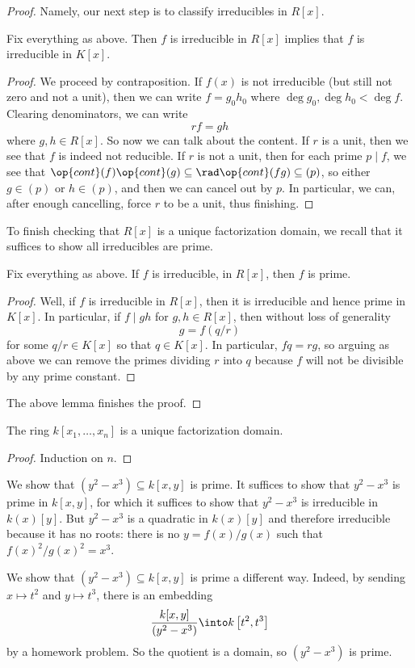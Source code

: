 \begin{proof}
	Namely, our next step is to classify irreducibles in $R[x]$.
	\begin{lemma}
		Fix everything as above. Then $f$ is irreducible in $R[x]$ implies that $f$ is irreducible in $K[x]$.
	\end{lemma}
	\begin{proof}
		We proceed by contraposition. If $f(x)$ is not irreducible (but still not zero and not a unit), then we can write $f=g_0h_0$ where $\deg g_0,\deg h_0<\deg f$. Clearing denominators, we can write
		\[rf=gh\]
		where $g,h\in R[x]$. So now we can talk about the content. If $r$ is a unit, then we see that $f$ is indeed not reducible. If $r$ is not a unit, then for each prime $p\mid f$, we see that $\op{cont}(f)\op{cont}(g)\subseteq\rad\op{cont}(fg)\subseteq(p)$, so either $g\in(p)$ or $h\in(p)$, and then we can cancel out by $p$. In particular, we can, after enough cancelling, force $r$ to be a unit, thus finishing.
	\end{proof}
	To finish checking that $R[x]$ is a unique factorization domain, we recall that it suffices to show all irreducibles are prime.
	\begin{lemma}
		Fix everything as above. If $f$ is irreducible, in $R[x]$, then $f$ is prime.
	\end{lemma}
	\begin{proof}
		Well, if $f$ is irreducible in $R[x]$, then it is irreducible and hence prime in $K[x]$. In particular, if $f\mid gh$ for $g,h\in R[x]$, then without loss of generality
		\[g=f(q/r)\]
		for some $q/r\in K[x]$ so that $q\in K[x]$. In particular, $fq=rg$, so arguing as above we can remove the primes dividing $r$ into $q$ because $f$ will not be divisible by any prime constant.
	\end{proof}
	The above lemma finishes the proof.
\end{proof}
\begin{corollary}
	The ring $k[x_1,\ldots,x_n]$ is a unique factorization domain.
\end{corollary}
\begin{proof}
	Induction on $n$.
\end{proof}
\begin{example}
	We show that $\left(y^2-x^3\right)\subseteq k[x,y]$ is prime. It suffices to show that $y^2-x^3$ is prime in $k[x,y]$, for which it suffices to show that $y^2-x^3$ is irreducible in $k(x)[y]$. But $y^2-x^3$ is a quadratic in $k(x)[y]$ and therefore irreducible because it has no roots: there is no $y=f(x)/g(x)$ such that $f(x)^2/g(x)^2=x^3$.
\end{example}
\begin{example}
	We show that $\left(y^2-x^3\right)\subseteq k[x,y]$ is prime a different way. Indeed, by sending $x\mapsto t^2$ and $y\mapsto t^3$, there is an embedding
	\[\frac{k[x,y]}{\left(y^2-x^3\right)}\into k\left[t^2,t^3\right]\]
	by a homework problem. So the quotient is a domain, so $\left(y^2-x^3\right)$ is prime.
\end{example}


